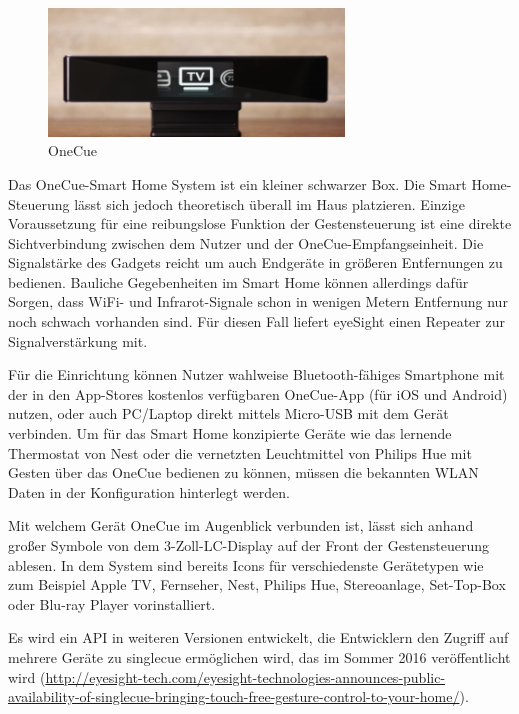 \begin{figure}[h!]
	\centering
	\includegraphics[width=0.7\textwidth]{img/Feedback-Mechanismen/OneCue.png}
	\caption{OneCue}
	\label{fig:feedbackOneCue}
\end{figure}

Das OneCue-Smart Home System ist ein kleiner schwarzer Box. Die Smart Home-Steuerung lässt sich jedoch theoretisch überall im Haus platzieren. Einzige Voraussetzung für eine reibungslose Funktion der Gestensteuerung ist eine direkte Sichtverbindung zwischen dem Nutzer und der OneCue-Empfangseinheit. Die Signalstärke des Gadgets reicht um auch Endgeräte in größeren Entfernungen zu bedienen. Bauliche Gegebenheiten im Smart Home können allerdings dafür Sorgen, dass WiFi- und Infrarot-Signale schon in wenigen Metern Entfernung nur noch schwach vorhanden sind. Für diesen Fall liefert eyeSight einen Repeater zur Signalverstärkung mit.

Für die Einrichtung können Nutzer wahlweise Bluetooth-fähiges Smartphone mit der in den App-Stores kostenlos verfügbaren OneCue-App (für iOS und Android) nutzen, oder auch PC/Laptop direkt mittels Micro-USB mit dem Gerät verbinden. Um für das Smart Home konzipierte Geräte wie das lernende Thermostat von Nest oder die vernetzten Leuchtmittel von Philips Hue mit Gesten über das OneCue bedienen zu können, müssen die bekannten WLAN Daten in der Konfiguration hinterlegt werden.

Mit welchem Gerät OneCue im Augenblick verbunden ist, lässt sich anhand großer Symbole von dem 3-Zoll-LC-Display auf der Front der Gestensteuerung ablesen. In dem System sind bereits Icons für verschiedenste Gerätetypen wie zum Beispiel Apple TV, Fernseher, Nest, Philips Hue, Stereoanlage, Set-Top-Box oder Blu-ray Player vorinstalliert.

Es wird ein API in weiteren Versionen entwickelt, die Entwicklern den Zugriff auf mehrere Geräte zu singlecue ermöglichen wird, das im Sommer 2016 veröffentlicht wird (\url{http://eyesight-tech.com/eyesight-technologies-announces-public-availability-of-singlecue-bringing-touch-free-gesture-control-to-your-home/}).

